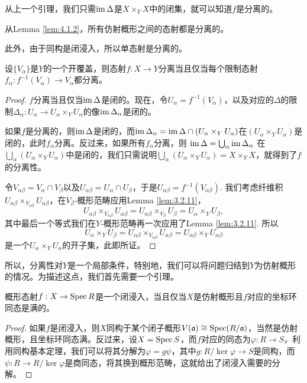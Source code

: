 从上一个引理，我们只需$\operatorname{im} \Delta$是$X\times_Y X$中的闭集，就可以知道$f$是分离的。

从Lemma \ref{lem:4.1.2}，所有仿射概形之间的态射都是分离的。

此外，由于同构是闭浸入，所以单态射是分离的。

\begin{pro}
	设$\{V_\alpha\}$是$Y$的一个开覆盖，则态射$f:X\to Y$分离当且仅当每个限制态射$f_\alpha:f^{-1}(V_\alpha)\to V_\alpha$都分离。
\end{pro}

\begin{proof}
	$f$分离当且仅当$\operatorname{im} \Delta$是闭的。现在，令$U_\alpha=f^{-1}(V_\alpha)$，以及对应的$\Delta$的限制$\Delta_\alpha:U_\alpha\to U_\alpha\times_Y U_\alpha$的像$\operatorname{im} \Delta_\alpha$是闭的。

	如果$f$是分离的，则$\operatorname{im} \Delta$是闭的，而$\operatorname{im} \Delta_{\alpha}=\operatorname{im} \Delta \cap (U_\alpha\times_Y U_\alpha)$在$(U_\alpha\times_Y U_\alpha)$是闭的，此时$f_\alpha$分离。反过来，如果所有$f_\alpha$分离，则
	$
	\operatorname{im} \Delta=\bigcup_\alpha \operatorname{im} \Delta_{\alpha}
	$
	在$\bigcup_\alpha (U_\alpha\times_Y U_\alpha)$中是闭的，我们只需说明$\bigcup_\alpha (U_\alpha\times_Y U_\alpha)=X\times_Y X$，就得到了$f$的分离性。

	令$V_{\alpha\beta}=V_\alpha\cap V_\beta$以及$U_{\alpha\beta}=U_\alpha\cap U_\beta$，于是$U_{\alpha\beta}=f^{-1}(V_{\alpha\beta})$. 我们考虑纤维积$U_{\alpha\beta}\times_{V_{\alpha\beta}}U_{\alpha\beta}$，在$V_\beta$-概形范畴应用Lemma \ref{lem:3.2.11}，
	\[
	U_{\alpha\beta}\times_{V_{\alpha\beta}}U_{\alpha\beta}=U_{\alpha\beta}\times_{V_\beta} U_\beta=U_{\alpha}\times_{Y} U_\beta,
	\]
	其中最后一个等式我们在$Y$-概形范畴再一次应用了Lemma \ref{lem:3.2.11}. 所以
	\[
	U_\alpha\times_Y U_\beta=U_{\alpha\beta}\times_{V_{\alpha\beta}}U_{\alpha\beta}=U_{\alpha\beta}\times_{Y}U_{\alpha\beta}
	\]
	是一个$U_\alpha\times_Y U_\alpha$的开子集，此即所证。
\end{proof}

所以，分离性对$Y$是一个局部条件，特别地，我们可以将问题归结到$Y$为仿射概形的情况。为描述这点，我们首先需要一个引理。

\begin{lem}
概形态射$f:X\to \operatorname{Spec} R$是一个闭浸入，当且仅当$X$是仿射概形且$f$对应的坐标环同态是满的。
\end{lem}

\begin{proof}
如果$f$是闭浸入，则$X$同构于某个闭子概形$V(\mathfrak{a})\cong \operatorname{Spec} (R/\mathfrak a)$，当然是仿射概形，且坐标环同态满。反过来，设$X=\operatorname{Spec} S$，而$f$对应的同态为$\varphi:R\to S$，利用同构基本定理，我们可以将其分解为$\varphi=g\psi$，其中$g:R/\ker \varphi\to S$是同构，而$\psi:R\to R/\ker\varphi$是商同态，将其换到概形范畴，这就给出了闭浸入需要的分解。
\end{proof}

